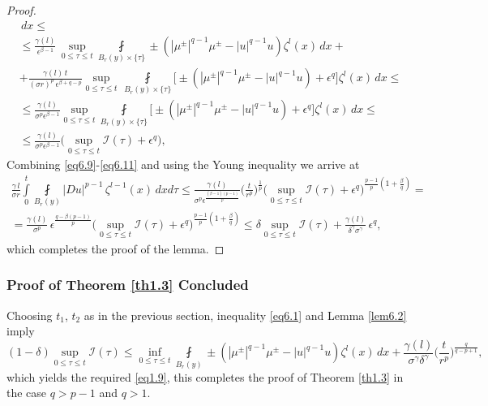 \documentclass[a4paper,11pt,fullpage]{article}
\numberwithin{equation}{section}
\begin{document}
\begin{proof}
\begin{multline}
\,dx
\leqslant\\\leqslant
\frac{\gamma(l)}{\epsilon^{\beta-1}}\,\sup\limits_{0\leqslant \tau\leqslant t}
\fint\limits_{B_{r}(y)\times\{\tau\}}\pm(|\mu^{\pm}|^{q-1}\mu^{\pm}-|u|^{q-1}u)\zeta^l(x)\,dx 
+\\+\frac{\gamma(l)\,t}{(\sigma r)^p\,\epsilon^{\beta+q-p}}\sup\limits_{0\leqslant \tau\leqslant t}\,\fint\limits_{B_{ r}(y)\times\{\tau\}}\big[\pm(|\mu^{\pm}|^{q-1}\mu^{\pm}-|u|^{q-1}u)+\epsilon^q\big]\zeta^l(x)
\,dx\leqslant\\\leqslant
\frac{\gamma(l)}{\sigma^p \epsilon^{\beta-1}}\sup\limits_{0\leqslant \tau\leqslant t}
\fint\limits_{B_{r}(y)\times\{\tau\}}\big[\pm(|\mu^{\pm}|^{q-1}\mu^{\pm}-|u|^{q-1}u)+\epsilon^q\big]\zeta^l(x)\,dx\leqslant\\\leqslant \frac{\gamma(l)}{\sigma^p \epsilon^{\beta-1}}\big(\sup\limits_{0\leqslant \tau\leqslant t}\mathcal{I}(\tau) +\epsilon^q\big),
\end{multline}
Combining \eqref{eq6.9}-\eqref{eq6.11} and using the Young inequality we arrive at
\begin{multline*}
\frac{\gamma\,l}{\sigma r}\int\limits^t_0\fint\limits_{B_{ r}(y)}|D u|^{p-1}\,\zeta^{l-1}(x)\,dx d\tau\leqslant
\frac{\gamma(l)}{\sigma^p \epsilon^{\frac{(\beta-1)(p-1)}{p}}}\Big(\frac{t}{r^p}\Big)^{\frac{1}{p}}\Big(
\sup\limits_{0\leqslant \tau\leqslant t}\mathcal{I}(\tau)+
\epsilon^q\Big)^{\frac{p-1}{p}(1+\frac{\beta}{q})}=\\=
\frac{\gamma(l)}{\sigma^p}\,\epsilon^{\frac{q-\beta(p-1)}{p}}\Big(
\sup\limits_{0\leqslant \tau\leqslant t}\mathcal{I}(\tau)+
\epsilon^q\Big)^{\frac{p-1}{p}(1+\frac{\beta}{q})}\leqslant \delta \sup\limits_{0\leqslant \tau\leqslant t}\mathcal{I}(\tau)+
\frac{\gamma(l)}{\delta^\gamma \sigma^\gamma}\,\epsilon^q,
\end{multline*}
which completes the proof of the lemma.
\end{proof}

\subsubsection{Proof of Theorem \ref{th1.3} Concluded}
Choosing $t_1$, $t_2$ as in the previous section, inequality \eqref{eq6.1} and Lemma \ref{lem6.2} imply
\begin{equation*}
(1-\delta)\sup\limits_{0\leqslant \tau\leqslant t}\mathcal{I}(\tau)\leqslant 
\inf\limits_{0\leqslant \tau\leqslant t}\fint\limits_{B_{r}(y)}\pm (|\mu^{\pm}|^{q-1}\mu^{\pm}-|u|^{q-1}u)\zeta^l(x)\,dx+
\frac{\gamma(l)}{\sigma^\gamma \delta^\gamma}\Big(\frac{t}{r^p}\Big)^{\frac{q}{q-p+1}},
\end{equation*}
which yields the required \eqref{eq1.9}, this completes the proof of Theorem \ref{th1.3} in the case $q>p-1$ and $q>1$.
\end{document}
